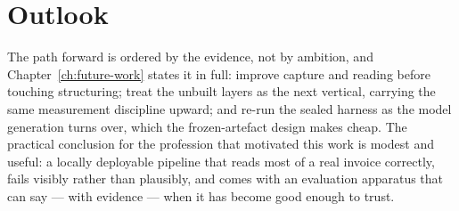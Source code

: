 \section*{Outlook}

The path forward is ordered by the evidence, not by ambition, and
Chapter~\ref{ch:future-work} states it in full: improve capture and
reading before touching structuring; treat the unbuilt layers as the next vertical,
carrying the same measurement discipline upward; and re-run the sealed harness as the
model generation turns over, which the frozen-artefact design makes cheap. The
practical conclusion for the profession that motivated this work is modest and
useful: a locally deployable pipeline that reads most of a real invoice correctly,
fails visibly rather than plausibly, and comes with an evaluation apparatus that can
say --- with evidence --- when it has become good enough to trust.
